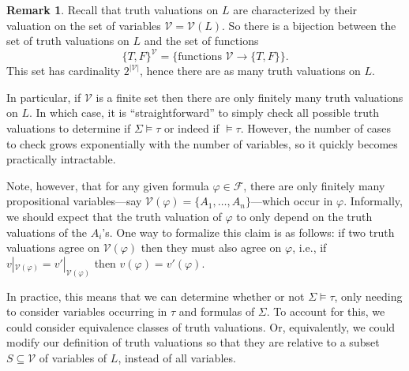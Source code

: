 \documentclass[12pt]{article}
\theoremstyle{definition}
\newtheorem{remark}[theorem]{Remark}
\renewcommand{\phi}{\varphi}
\newcommand{\<}{\langle}
\renewcommand{\>}{\rangle}
\newcommand{\seq}{\subseteq}
\newcommand{\FF}{\mathcal{F}}
\newcommand{\VV}{\mathcal{V}}
\begin{document}
\begin{remark}
    Recall that truth valuations on $L$ are characterized by their valuation on the set of variables $\VV = \VV(L)$.
    So there is a bijection between the set of truth valuations on $L$ and the set of functions
    \[
        \{T, F\}^\VV = \{\text{functions } \VV \to \{T, F\}\}.
    \]
    This set has cardinality $2^{|\VV|}$, hence there are as many truth valuations on $L$.

    In particular, if $\VV$ is a finite set then there are only finitely many truth valuations on $L$.
    In which case, it is ``straightforward'' to simply check all possible truth valuations to determine if $\Sigma \vDash \tau$ or indeed if $\vDash \tau$.
    However, the number of cases to check grows exponentially with the number of variables, so it quickly becomes practically intractable.

    Note, however, that for any given formula $\phi \in \FF$, there are only finitely many propositional variables---say $\VV(\phi) = \{A_1, \dots, A_n\}$---which occur in $\phi$.
    Informally, we should expect that the truth valuation of $\phi$ to only depend on the truth valuations of the $A_i$'s.
    One way to formalize this claim is as follows: if two truth valuations agree on $\VV(\phi)$ then they must also agree on $\phi$, i.e., if $v|_{\VV(\phi)} = v'|_{\VV(\phi)}$ then $v(\phi) = v'(\phi)$.

    In practice, this means that we can determine whether or not $\Sigma \vDash \tau$, only needing to consider variables occurring in $\tau$ and formulas of $\Sigma$.
    To account for this, we could consider equivalence classes of truth valuations.
    Or, equivalently, we could modify our definition of truth valuations so that they are relative to a subset $S \seq \VV$ of variables of $L$, instead of all variables.
\end{remark}
\end{document}

